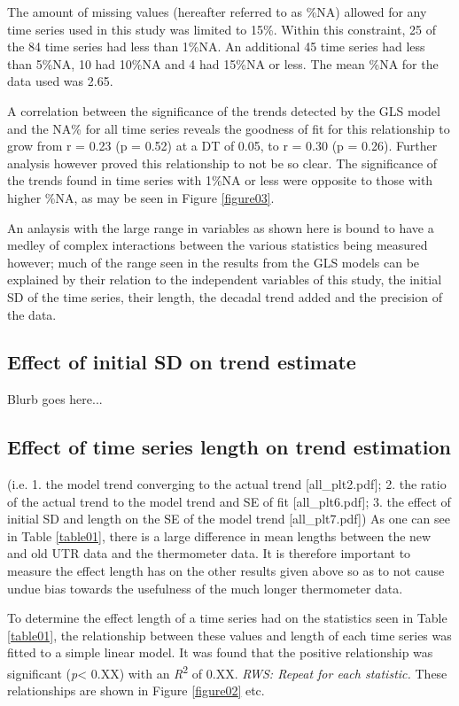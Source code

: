 \documentclass{ametsoc}
\begin{document}
The amount of missing values (hereafter referred to as \%NA) allowed for any time series used in this study was limited to 15\%. Within this constraint, 25 of the 84 time series had less than 1\%NA. An additional 45 time series had less than 5\%NA, 10 had 10\%NA and 4 had 15\%NA or less. The mean \%NA for the data used was 2.65.

A correlation between the significance of the trends detected by the GLS model and the NA\% for all time series reveals the goodness of fit for this relationship to grow from r = 0.23 (p = 0.52) at a DT of 0.05, to r = 0.30 (p = 0.26). Further analysis however proved this relationship to not be so clear. The significance of the trends found in time series with 1\%NA or less were opposite to those with higher \%NA, as may be seen in Figure \ref{figure03}.

An anlaysis with the large range in variables as shown here is bound to have a medley of complex interactions between the various statistics being measured however; much of the range seen in the results from the GLS models can be explained by their relation to the independent variables of this study, the initial SD of the time series, their length, the decadal trend added and the precision of the data.

\subsection{Effect of initial SD on trend estimate}
Blurb goes here...

\subsection{Effect of time series length on trend estimation}
(i.e. 1. the model trend converging to the actual trend [all_plt2.pdf]; 2. the ratio of the actual trend to the model trend and SE of fit [all_plt6.pdf]; 3. the effect of initial SD and length on the SE of the model trend [all_plt7.pdf])
As one can see in Table \ref{table01}, there is a large difference in mean lengths between the new and old UTR data and the thermometer data. It is therefore important to measure the effect length has on the other results given above so as to not cause undue bias towards the usefulness of the much longer thermometer data.

To determine the effect length of a time series had on the statistics seen in Table \ref{table01}, the relationship between these values and length of each time series was fitted to a simple linear model. It was found that the positive relationship was significant (\emph{p}\num{< 0.XX}) with an \emph{R}\textsuperscript{2} of 0.XX. \emph{RWS: Repeat for each statistic.} These relationships are shown in Figure \ref{figure02} etc.
\end{document}

